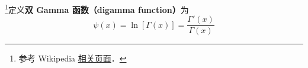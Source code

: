 
\begin{issues}
\issueDraft
\end{issues}

\footnote{参考 Wikipedia \href{https://en.wikipedia.org/wiki/Digamma_function}{相关页面}．}定义\textbf{双 Gamma 函数（digamma function）}为
\begin{equation}
\psi(x) = \ln[\Gamma(x)] = \frac{\Gamma'(x)}{\Gamma(x)}
\end{equation}
